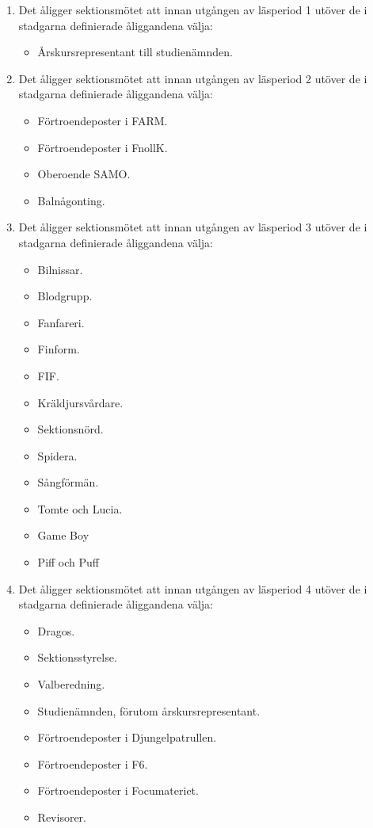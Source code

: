 \documentclass[11pt,a4paper]{article}
\begin{document}
\begin{enumerate}[\thesubsection .1]

  \item Det åligger sektionsmötet att innan utgången av läsperiod 1
  utöver de i stadgarna definierade åliggandena välja:
    \begin{itemize}
      \item Årskursrepresentant till studienämnden.
    \end{itemize}

  \item Det åligger sektionsmötet att innan utgången av läsperiod 2
    utöver de i stadgarna definierade åliggandena välja:
    \begin{itemize}
      \item Förtroendeposter i FARM.
      \item Förtroendeposter i FnollK.
      \item Oberoende SAMO.
      \item Balnågonting.
    \end{itemize}

  \item Det åligger sektionsmötet att innan utgången av läsperiod 3
    utöver de i stadgarna definierade åliggandena välja:
    \begin{itemize}
      \item Bilnissar.
      \item Blodgrupp.
      \item Fanfareri.
      \item Finform.
      \item FIF.
      \item Kräldjursvårdare.
      \item Sektionsnörd.
      \item Spidera.
      \item Sångförmän.
      \item Tomte och Lucia.
      \item Game Boy
      \item Piff och Puff
    \end{itemize}

  \item Det åligger sektionsmötet att innan utgången av  läsperiod 4
    utöver de i stadgarna definierade åliggandena välja:
    \begin{itemize}
      \item Dragos.
      \item Sektionsstyrelse.
      \item Valberedning.
      \item Studienämnden, förutom årskursrepresentant.
      \item Förtroendeposter i Djungelpatrullen.
      \item Förtroendeposter i F6.
      \item Förtroendeposter i Focumateriet.
       \item Revisorer.
    \end{itemize}

\end{enumerate}
\end{document}
